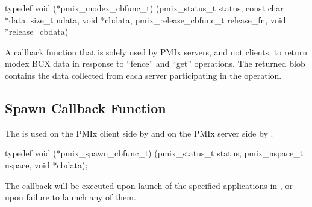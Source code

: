 \cspecificstart
\begin{codepar}
typedef void (*pmix_modex_cbfunc_t)
    (pmix_status_t status,
     const char *data, size_t ndata,
     void *cbdata,
     pmix_release_cbfunc_t release_fn,
     void *release_cbdata)
\end{codepar}
\cspecificend

\begin{arglist}
\end{arglist}

\descr

A callback function that is solely used by PMIx servers, and not clients, to return modex \ac{BCX} data in response to ``fence'' and ``get'' operations.
The returned blob contains the data collected from each server participating in the operation.



\subsection{Spawn Callback Function}

\summary

The  is used on the PMIx client side by  and on the PMIx server side by .

\cspecificstart
\begin{codepar}
typedef void (*pmix_spawn_cbfunc_t)
    (pmix_status_t status,
     pmix_nspace_t nspace, void *cbdata);
\end{codepar}
\cspecificend

\begin{arglist}
\end{arglist}


\descr

The callback will be executed upon launch of the specified applications in , or upon failure to launch any of them.

